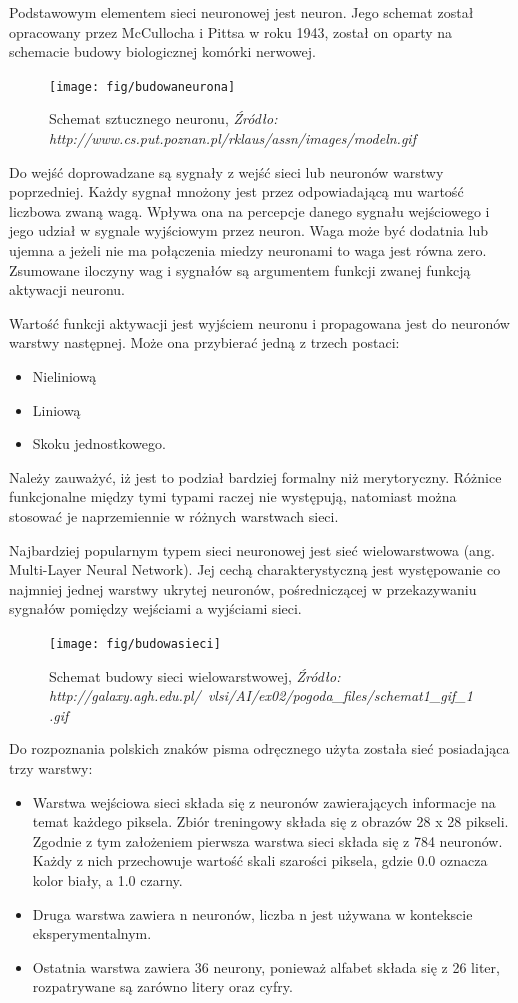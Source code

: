 \documentclass[brudnopis]{xmgr}
\begin{document}
Podstawowym elementem sieci neuronowej jest neuron. Jego schemat został opracowany przez McCullocha i Pittsa w roku 1943, został on oparty na schemacie budowy biologicznej komórki nerwowej.

\begin{figure}[!tbh]
\centering
\texttt{[image: fig/budowaneurona]}
\caption{Schemat sztucznego neuronu, \emph{Źródło: http://www.cs.put.poznan.pl/rklaus/assn/images/modeln.gif}}
\end{figure}

Do wejść doprowadzane są sygnały z wejść sieci lub neuronów warstwy poprzedniej. Każdy sygnał mnożony jest przez odpowiadającą mu wartość liczbowa zwaną wagą. Wpływa ona na percepcje danego sygnału wejściowego i jego udział w sygnale wyjściowym przez neuron. Waga może być dodatnia lub ujemna a jeżeli nie ma połączenia miedzy neuronami to waga jest równa zero. Zsumowane iloczyny wag i sygnałów są argumentem funkcji zwanej funkcją aktywacji neuronu.
\newpage

Wartość funkcji aktywacji jest wyjściem neuronu i propagowana jest do neuronów warstwy następnej. Może ona przybierać jedną z trzech postaci:
\begin{itemize}
\item
Nieliniową
\item
Liniową
\item
Skoku jednostkowego.
\end{itemize}

Należy zauważyć, iż jest to podział bardziej formalny niż merytoryczny. Różnice funkcjonalne między tymi typami raczej nie występują, natomiast można stosować je naprzemiennie w różnych warstwach sieci.

Najbardziej popularnym typem sieci neuronowej jest sieć wielowarstwowa (ang. Multi-Layer Neural Network). Jej cechą charakterystyczną jest występowanie co najmniej jednej warstwy ukrytej neuronów, pośredniczącej w przekazywaniu sygnałów pomiędzy wejściami a wyjściami sieci.

\begin{figure}[!tbh]
\centering
\texttt{[image: fig/budowasieci]}
\caption{Schemat budowy sieci wielowarstwowej, \emph{Źródło: http://galaxy.agh.edu.pl/~vlsi/AI/ex02/pogoda\_files/schemat1\_gif\_1.gif}}
\end{figure}
\newpage

Do rozpoznania polskich znaków pisma odręcznego użyta została sieć posiadająca trzy warstwy:

\begin{itemize}
\item
Warstwa wejściowa sieci składa się z neuronów zawierających informacje na temat każdego piksela. Zbiór treningowy składa się z obrazów 28 x 28 pikseli. Zgodnie z tym założeniem pierwsza warstwa sieci składa się z 784 neuronów. Każdy z nich przechowuje wartość skali szarości piksela, gdzie 0.0 oznacza kolor biały, a 1.0 czarny.
\item
Druga warstwa zawiera n neuronów, liczba n jest używana w kontekscie eksperymentalnym.
\item
Ostatnia warstwa zawiera 36 neurony, ponieważ alfabet składa się z 26 liter, rozpatrywane są zarówno litery oraz cyfry.
\end{itemize}
\end{document}
